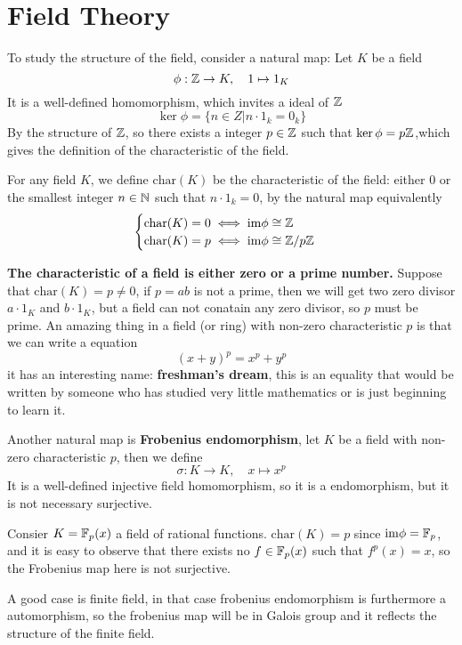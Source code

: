 \documentclass[en,geye,blue,normal,12pt]{elegantnote}
\begin{document}
\section{Field Theory}

To study the structure of the field, consider a natural map: Let \(K\) be a field
\[\phi: \mathbb{Z} \to K, \quad  1 \mapsto 1_K\]
It is a well-defined homomorphism, which invites a ideal of \(\mathbb{Z}\)
\[\ker \phi = \{n \in Z| n \cdot 1_k = 0_k\}\]
By the structure of \(\mathbb{Z}\), so there exists a integer \(p \in \mathbb{Z}\) such that \(\ker \phi = p \mathbb{Z}\),which gives the definition of the characteristic of the field.
\begin{definition}
  For any field \(K\), we define \(\mathrm{char}(K)\) be the characteristic of the field: either 0 or the smallest integer \(n \in \mathbb{N}\) such that \(n\cdot1_k = 0\), by the natural map equivalently
  \[\begin{cases}
    \mathrm{char}(K) = 0 \iff  \mathrm{im}\phi \cong \mathbb{Z} \\
    \mathrm{char}(K) = p \iff  \mathrm{im}\phi \cong \mathbb{Z}/p\mathbb{Z}
  \end{cases}\]
\end{definition}
\textbf{The characteristic of a field is either zero or a prime number.} Suppose that \(\mathrm{char}(K) = p \neq 0\), if \(p =ab\) is not a prime, then we will get two zero divisor \(a\cdot1_K\) and \(b\cdot1_K\), but a field can not conatain any zero divisor, so \(p\) must be prime. An amazing thing in a field (or ring) with non-zero characteristic \(p\) is that we can write a equation
\[(x+y)^p = x^p + y^p\]
it has an interesting name: \textbf{freshman's dream}, this is an equality that would be written by someone who has studied very little mathematics or is just beginning to learn it.

Another natural map is \textbf{Frobenius endomorphism}, let \(K\) be a field with non-zero characteristic \(p\), then we define 
\[\sigma: K \to K, \quad x \mapsto x^p\]
It is a well-defined injective field homomorphism, so it is a endomorphism, but it is not necessary surjective.

\begin{example}
  Consier \(K = \mathbb{F}_p(x)\) a field of rational functions. \(\mathrm{char}(K) = p\) since \(\mathrm{im} \phi = \mathbb{F}_p\), and it is easy to observe that there exists no \(f \in \mathbb{F}_p(x)\) such that \(f^p(x) = x\), so the Frobenius map here is not surjective. 
\end{example}
A good case is finite field, in that case frobenius endomorphism is furthermore a automorphism, so the frobenius map will be in Galois group and it reflects the structure of the finite field.
\end{document}
